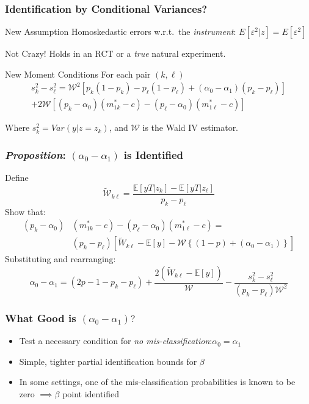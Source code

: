\documentclass{beamer}
\begin{document}
\begin{frame}
  \frametitle{Identification by Conditional Variances?} 
  \begin{block}{New Assumption}
    Homoskedastic errors w.r.t.\ the \emph{instrument}: $E[\varepsilon^2|z]=E[\varepsilon^2]$
  \end{block}
  \begin{block}{Not Crazy!}
    Holds in an RCT or a \emph{true} natural experiment.
  \end{block}
  \begin{alertblock}{New Moment Conditions}
    For each pair $(k,\ell)$
\begin{align*}
  s^2_k - s^2_\ell = \mathcal{W}^2\left[p_k(1-p_k) - p_\ell(1-p_\ell) + (\alpha_0 - \alpha_1)(p_k - p_\ell)\right]\\  
  + 2\mathcal{W}\left[(p_k - \alpha_0)(m^*_{1k}-c) - (p_\ell - \alpha_0)(m^*_{1\ell}-c)\right]
\end{align*}

\vspace{0.5em}
Where $s^2_k = Var(y|z=z_k)$, and $\mathcal{W}$ is the Wald IV estimator. 
  \end{alertblock}
\end{frame}
\begin{frame}
  \frametitle{\emph{Proposition}: $(\alpha_0 - \alpha_1)$ is Identified}
  Define
\begin{equation*}
  \widetilde{\mathcal{W}}_{k\ell} = \frac{\mathbb{E}[yT|z_k] - \mathbb{E}[yT|z_\ell]}{p_k - p_\ell}
\end{equation*}
Show that:
\begin{align*}
(p_k - \alpha_0)&(m^*_{1k}-c) - (p_\ell - \alpha_0)(m^*_{1\ell}-c) =\\
& (p_k - p_\ell)\left[ \widetilde{W}_{k\ell} - \mathbb{E}[y] - \mathcal{W}\left\{ (1 - p) + (\alpha_0 - \alpha_1) \right\} \right]
\end{align*}
Substituting and rearranging: 
\begin{equation*}
  \alpha_0 - \alpha_1 = (2p - 1 - p_k - p_\ell) + \frac{2(\widetilde{W}_{k\ell} - \mathbb{E}[y])}{\mathcal{W}} - \frac{s_k^2 - s_\ell^2}{(p_k - p_\ell)\mathcal{W}^2}
\end{equation*}
\end{frame}
\begin{frame}
  \frametitle{What Good is $(\alpha_0 - \alpha_1)?$}
    \begin{itemize}
      \item Test a necessary condition for \emph{no mis-classification}:$\alpha_0 = \alpha_1$ 
      \item Simple, tighter partial identification bounds for $\beta$
      \item In some settings, one of the mis-classification probabilities is known to be zero $\implies \beta$ point identified 
    \end{itemize}
\end{frame}
\end{document}
